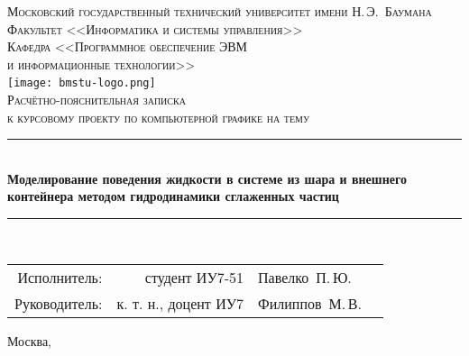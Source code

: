 \newcommand{\HRule}{\rule{\linewidth}{0.5mm}}

\begin{center}

\textsc{\large Московский государственный технический университет имени Н.\,Э.~Баумана}\\[0.5cm]
\textsc{Факультет <<Информатика и системы управления>>}\\
\textsc{Кафедра <<Программное обеспечение ЭВМ\\и информационные технологии>>}\\[0.25cm]

\texttt{[image: bmstu-logo.png]}~\\[2.25cm]

\textsc{\large Расчётно-пояснительная записка}\\
\textsc{к курсовому проекту по компьютерной графике на тему}

\HRule \\[0.5cm]
{\huge \bfseries Моделирование поведения жидкости в системе из шара и внешнего контейнера методом гидродинамики сглаженных частиц}

\HRule \\[0.5cm]

\vfill

\begin{flushright}
  \begin{tabular}{rrlc}
    Исполнитель:  &       студент ИУ7-51 & Павелко~П.\,Ю.  & \underline{\hspace{3cm}} \\[1cm]
    Руководитель: & к. т. н., доцент ИУ7 & Филиппов~М.\,В. & \underline{\hspace{3cm}} \\[1cm]
  \end{tabular}
\end{flushright}

{\large Москва, \the\year}

\end{center}

\newpage
{}
